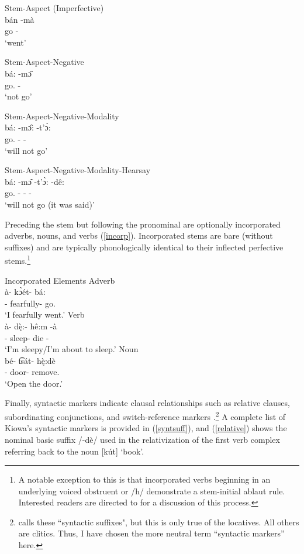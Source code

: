 \documentclass[output=paper]{langscibook}
\begin{document}
\ex Stem-Aspect (Imperfective) \label{I}\\
\gll bán -m\`a\\
go -{\Ipfv}\\
\trans `went'

\ex Stem-Aspect-Negative \label{AN} \\
\gll bá: -m\^{ɔ}\\
go.{\Pfv} -{\Neg}\\
\trans `not go'

\ex Stem-Aspect-Negative-Modality \label{ANM} \\
\gll bá: -m\^{ɔ}: -t'\`{ɔ}:\\
go.{\Pfv} -{\Neg} -{\Fut}\\
\trans `will not go'

\ex Stem-Aspect-Negative-Modality-Hearsay \label{ANMH} \\
\gll bá: -m\^{ɔ} -t'\`{ɔ}: -dê:\\
go.{\Pfv} -{\Neg} -{\Fut} -{\Hsy}\\
\trans `will not go (it was said)'
\z

\z 

Preceding the stem but following the pronominal are optionally incorporated adverbs, nouns, and verbs (\ref{incorp}). Incorporated stems are bare (without suffixes) and are typically phonologically identical to their inflected perfective stems.\footnote{A notable exception to this is that incorporated verbs beginning in an underlying voiced obstruent or /h/ demonstrate a stem-initial ablaut rule. Interested readers are directed to \citet[60]{Watkins:1984} for a discussion of this process.}

\ea Incorporated Elements \citep[][46---47]{Miller:2018} \label{incorp}
\ea Adverb \\
\gll \`a- k\`{ɔ}ét- bá:\\
[\First\Sg]- fearfully- go.\Pfv\\
\trans `I fearfully went.'
\ex Verb \\
\gll \`a- d\k{è}:- hê:m -\`a\\
[\First\Sg]- sleep- die -{\Ipfv}\\
\trans `I'm sleepy/I'm about to sleep.'
\ex Noun \\
\gll bé- t͡sát- h\k{è}:dè \\
[\Second\Sg/\Aarg:\Inv/\Obj]- door- remove.\Ipfv\\
\trans `Open the door.'
\z
\z

\hspace*{-.9pt}Finally, syntactic markers indicate clausal relationships such as relative clauses, subordinating conjunctions, and switch-reference markers \citep[][]{Watkins:1984}.\footnote{\citet{Watkins:1984} calls these ``syntactic suffixes", but this is only true of the locatives. All others are clitics. Thus, I have chosen the more neutral term ``syntactic markers'' here.} A complete list of Kiowa’s syntactic markers is provided in (\ref{syntsuff}), and (\ref{relative}) shows the nominal basic suffix /-dè/ used in the relativization of the first verb complex referring back to the noun [kút] `book'.
\end{document}
